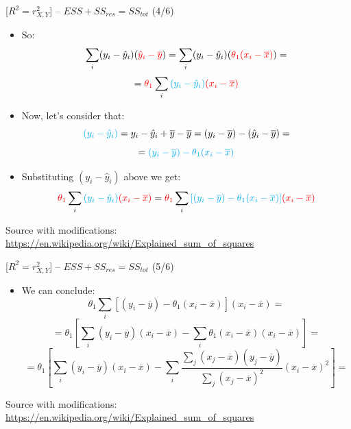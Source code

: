 \documentclass{beamer}
\begin{document}


\begin{frame}
{\centerline{ [$R^2 = r_{X,Y}^2$] -- $ESS + SS_{res} = SS_{tot} $ (4/6)}}

\begin{itemize}
\item So:
$$\sum_i(y_{i}-{\hat {y}}_{i})({\textcolor{red}{\hat {y}_{i}-{\overline {y}}}}) = \sum_i(y_{i}-{\hat {y}}_{i})(\textcolor{red}{\theta_1 (x_i - \overline{x})})=$$
$$= \textcolor{red}{\theta_1} \sum_i\textcolor{cyan}{(y_{i}-{\hat {y}}_{i})}\textcolor{red}{(x_i - \overline{x})}$$
\item Now, let's consider that:
$$\textcolor{cyan}{(y_{i}-{\hat {y}}_{i})} = y_{i}-{\hat {y}}_{i} + \overline {y} - \overline {y} = (y_{i}-{\overline {y}})-({\hat {y}}_{i}-{\overline {y}})= $$
$$ = \textcolor{cyan}{(y_{i}-{\overline {y}})-{\theta_1}(x_{i}-{\overline {x}})}$$
\item Substituting $(y_{i}-{\hat {y}}_{i})$ above we get:
$$\textcolor{red}{\theta_1} \sum_i\textcolor{cyan}{(y_{i}-{\hat {y}}_{i})}\textcolor{red}{(x_i - \overline{x})}=\textcolor{red}{\theta_1} \sum_i\textcolor{cyan}{[(y_{i}-{\overline {y}})-{\theta_1}(x_{i}-{\overline {x}}) ]}\textcolor{red}{(x_i - \overline{x})} $$


\end{itemize}

\begin{center}
\tiny 
Source with modifications: \url{https://en.wikipedia.org/wiki/Explained_sum_of_squares}
\end{center}

\end{frame}

\begin{frame}
{\centerline{ [$R^2 = r_{X,Y}^2$] -- $ESS + SS_{res} = SS_{tot} $ (5/6)}}

\begin{itemize}
\item We can conclude:
$$ \theta_1 \sum_i[(y_{i}-{\overline {y}})-{\theta_1}(x_{i}-{\overline {x}}) ](x_i - \overline{x}) = $$
$$ = \theta_1 [\sum_i (y_{i}-{\overline {y}}) (x_i - \overline{x}) -
\sum_i{\theta_1}(x_{i}-{\overline {x}}) (x_i - \overline{x})] = $$
$$ = \theta_1 [\sum_i (y_{i}-{\overline {y}}) (x_i - \overline{x}) -
\sum_i{{\frac {\sum _{j}(x_{j}-{\overline {x}})(y_{j}-{\overline {y}})}{\sum _{j}(x_{j}-{\overline {x}})^{2}}}
}(x_{i}-{\overline {x}})^2] = $$


\end{itemize}

\begin{center}
\tiny 
Source with modifications: \url{https://en.wikipedia.org/wiki/Explained_sum_of_squares}
\end{center}

\end{frame}
\end{document}
